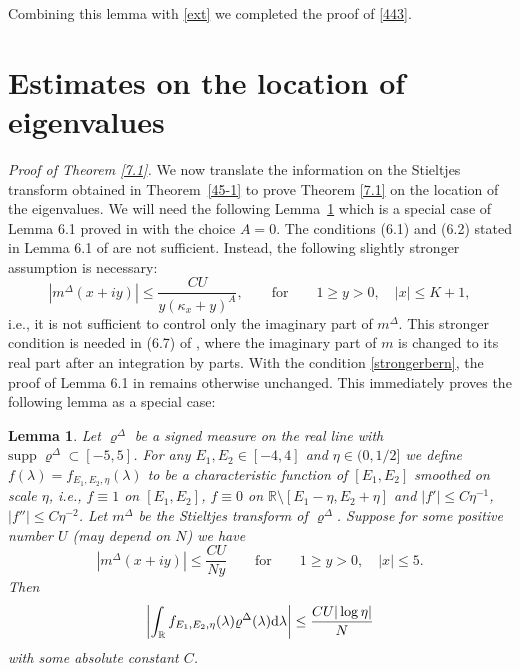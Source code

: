 \documentclass[draft]{article}
\newcommand{\rd}{{\rm d}}
\newcommand{\be}{\begin{equation}}
\newcommand{\ee}{\end{equation}}
\newcommand{\R}{{\mathbb R }}
\newtheorem{lemma}[theorem]{Lemma}
\newcommand{\qed}{\hfill\fbox{}\par\vspace{0.3mm}}
\numberwithin{equation}{section}
\numberwithin{theorem}{section}
\numberwithin{definition}{section}
\numberwithin{remark}{section}
\begin{document}
Combining this lemma with  \eqref{ext} we 
 completed the proof of \eqref{443}.  \qed





\bigskip



\section{Estimates on the location of eigenvalues}




{\it Proof of Theorem \ref{7.1}.}
We now translate the information on the Stieltjes transform obtained
in Theorem~\ref{45-1} to prove Theorem \ref{7.1} on the location of the eigenvalues. 
We will need the following Lemma~\ref{lm:HS1}
which is a special case  of Lemma 6.1 proved in \cite{EYY2}
with the choice  $A=0$. The conditions (6.1) and (6.2) stated in 
Lemma 6.1  of  \cite{EYY2} are not sufficient.  Instead,  the following slightly stronger assumption is necessary:
\be\label{strongerbern}
    |m^\Delta (x+iy)|\le \frac{CU}{y(\kappa_x+y)^A}, \qquad
\mbox{for} \qquad 1\ge y >0,\quad |x|\le K+1,
\ee
i.e., it is not sufficient to control only the imaginary part of $m^\Delta$.
This stronger condition is needed in (6.7) of \cite{EYY2}, where
the imaginary part of $m$ is changed to its real part after an integration by parts. 
With  the condition \eqref{strongerbern},   the proof of  Lemma 6.1  in  \cite{EYY2}  remains otherwise unchanged.
This immediately proves the following lemma as a special case:



\begin{lemma}\label{lm:HS1}
Let $\varrho^\Delta$ be a signed measure on the real line with $\mbox{supp} \;\varrho^\Delta \subset
[-5,5]$. 
For any $E_1, E_2 \in [-4,  4]$ and $\eta\in(0,1/2]$ we define $f(\lambda)=f_{E_1,E_2,\eta}(\lambda)$
to be a characteristic function of $[E_1, E_2]$ smoothed on scale $\eta$, i.e.,
$f\equiv 1$ on $[E_1, E_2]$, $f\equiv 0$ on $\R\setminus [E_1-\eta, E_2+\eta]$
and $|f'|\le C\eta^{-1}$, $|f''|\le C\eta^{-2}$. 
Let $m^\Delta$ be the Stieltjes transform of $\varrho^\Delta$.
Suppose for some positive number $U$ (may depend on $N$)
we have
\be
   | m^\Delta (x+iy)|\le \frac{CU}{N y } \qquad \mbox{for} \qquad
1\ge y>0, \quad |x|\le 5.
\label{trivv1}
\ee
Then
\be
   \left|\int_\R f_{E_1,E_2,\eta}(\lambda)\varrho^\Delta(\lambda)\rd\lambda \right|  \le
  \frac{CU|\log \eta|}{ N }
\label{genHS1}
\ee
with some absolute constant $C$. \qed
\end{lemma}
\end{document}

